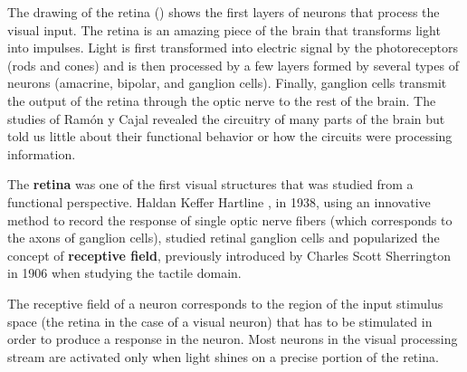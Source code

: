 The drawing of the retina (\fig{\ref{fig:cajal}}) shows the first layers of neurons that process the visual input. The retina is an amazing piece of the brain that transforms light into impulses. Light is first transformed into electric signal by the photoreceptors 
(rods and cones) and is then processed by a few layers formed by several types of neurons (amacrine, bipolar, and ganglion cells). Finally, ganglion cells transmit the output of the retina through the optic nerve to the rest of the brain. The studies of Ram\'{o}n y Cajal revealed the circuitry of many parts of the brain but told us little about their functional behavior or how the circuits were processing information. 

The {\bf retina} 
was one of the first visual structures that was studied from a functional perspective. Haldan Keffer Hartline \cite{Hartline1938}, in 1938, using an innovative method to record the response of single optic nerve fibers (which corresponds to the axons of ganglion cells),  
studied retinal ganglion cells and popularized the concept of {\bf receptive field}, previously introduced by Charles Scott Sherrington \cite{Sherrington1906} in 1906 when studying the tactile domain. 


The receptive field of a  neuron corresponds to the region of the input stimulus space (the retina in the case of a visual neuron) that has to be stimulated in order to produce a response in the neuron. Most neurons in the visual processing stream are activated only when light shines on a precise portion of the retina.


